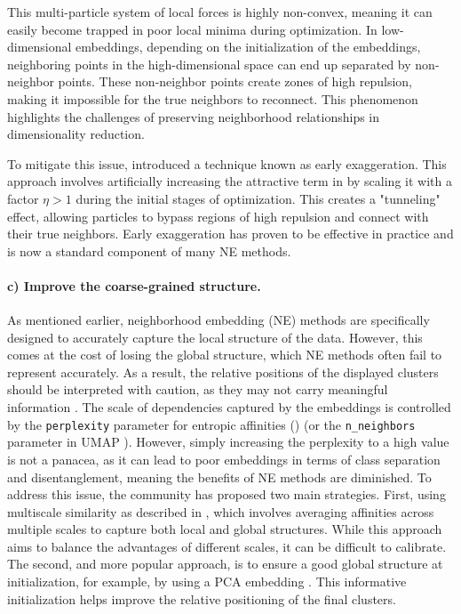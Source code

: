 This multi-particle system of local forces is highly non-convex, meaning it can easily become trapped in poor local minima during optimization. In low-dimensional embeddings, depending on the initialization of the embeddings, neighboring points in the high-dimensional space can end up separated by non-neighbor points. These non-neighbor points create zones of high repulsion, making it impossible for the true neighbors to reconnect. This phenomenon highlights the challenges of preserving neighborhood relationships in dimensionality reduction. 

To mitigate this issue, \citet{van2008visualizing} introduced a technique known as early exaggeration. This approach involves artificially increasing the attractive term in  by scaling it with a factor $\eta > 1$ during the initial stages of optimization. This creates a "tunneling" effect, allowing particles to bypass regions of high repulsion and connect with their true neighbors. Early exaggeration has proven to be effective in practice and is now a standard component of many NE methods.


\paragraph{c) Improve the coarse-grained structure.} As mentioned earlier, neighborhood embedding (NE) methods are specifically designed to accurately capture the local structure of the data. However, this comes at the cost of losing the global structure, which NE methods often fail to represent accurately. As a result, the relative positions of the displayed clusters should be interpreted with caution, as they may not carry meaningful information \citep{kobak2019art}. The scale of dependencies captured by the embeddings is controlled by the \texttt{perplexity} parameter for entropic affinities () (or the \texttt{n\_neighbors} parameter in UMAP \citep{mcinnes2018umap}). However, simply increasing the perplexity to a high value is not a panacea, as it can lead to poor embeddings in terms of class separation and disentanglement, meaning the benefits of NE methods are diminished. To address this issue, the community has proposed two main strategies. First, using multiscale similarity as described in \citep{lee2015multi}, which involves averaging affinities across multiple scales to capture both local and global structures. While this approach aims to balance the advantages of different scales, it can be difficult to calibrate. The second, and more popular approach, is to ensure a good global structure at initialization, for example, by using a PCA embedding \citep{wattenberg2016use}. This informative initialization helps improve the relative positioning of the final clusters.

